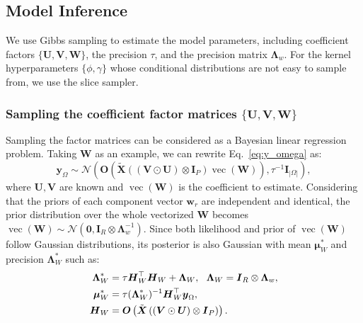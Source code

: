 \documentclass[12pt]{article}
\newcommand{\bd}[1]{\boldsymbol{#1}}
\begin{document}
\subsection{Model Inference}
We use Gibbs sampling to estimate the model parameters, including coefficient factors $\{\boldsymbol{U},\boldsymbol{V},\boldsymbol{W}\}$, the precision $\tau$, and the precision matrix $\boldsymbol{\Lambda}_{w}$. For the kernel hyperparameters $\{\phi,\gamma\}$ whose conditional distributions are not easy to sample from, we use the slice sampler. %


\subsubsection{Sampling the coefficient factor matrices $\{\boldsymbol{U},\boldsymbol{V},\boldsymbol{W}\}$}  

Sampling the factor matrices can be considered as a Bayesian linear regression problem. Taking $\bd{W}$ as an example, we can rewrite Eq.~\eqref{eq:y_omega} as:
\begin{equation} \label{Eq:STVC-sampleW}
    \boldsymbol{y}_{\Omega}\sim \mathcal{N}\left(\boldsymbol{O}\left(\tilde{\bd{X}}\left((\boldsymbol{V}\odot\boldsymbol{U})\otimes\boldsymbol{I}_{P}\right)\operatorname{vec}(\boldsymbol{W})\right),\tau^{-1}\boldsymbol{I}_{|\Omega|}\right),
\end{equation}
where $\bd{U},\bd{V}$ are known and $\operatorname{vec}(\boldsymbol{W})$ is the coefficient to estimate. Considering that the priors of each component vector $\boldsymbol{w}_{r}$ are independent and identical, the prior distribution over the whole vectorized $\boldsymbol{W}$ becomes  $\operatorname{vec}(\boldsymbol{W})\sim\mathcal{N}(\boldsymbol{0},\boldsymbol{I}_{R}\otimes\boldsymbol{\Lambda}_{w}^{-1})$. Since both likelihood and prior of $\operatorname{vec}(\boldsymbol{W})$ follow Gaussian distributions, its posterior is also Gaussian with mean $\boldsymbol{\mu}_{W}^{*}$ and precision $\boldsymbol{\Lambda}_{W}^{*}$ such as:
\begin{equation} \notag
\begin{aligned}
    \boldsymbol{\Lambda}_{W}^{*}&=\tau\boldsymbol{H}_{W}^{\top}\boldsymbol{H}_{W}+\boldsymbol{\Lambda}_{W},\ \  \boldsymbol{\Lambda}_{W}=\boldsymbol{I}_{R}\otimes\boldsymbol{\Lambda}_{w}, \\
    \boldsymbol{\mu}_{W}^{*}&=\tau(\boldsymbol{\Lambda}_{W}^{*})^{-1}\boldsymbol{H}_{W}^{\top}\boldsymbol{y}_{\Omega}, \\
    \boldsymbol{H}_{W}&=\boldsymbol{O}\left(\tilde{\bd{X}}\left((\boldsymbol{V}\odot\boldsymbol{U})\otimes\boldsymbol{I}_{P}\right)\right).
\end{aligned}
\end{equation}
\end{document}
